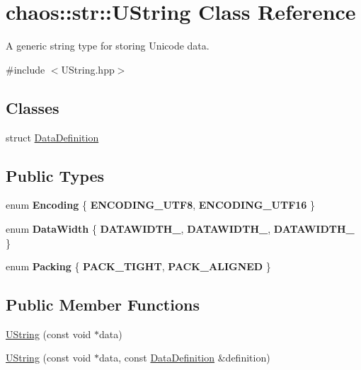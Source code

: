 \hypertarget{classchaos_1_1str_1_1_u_string}{\section{chaos\-:\-:str\-:\-:U\-String Class Reference}
\label{classchaos_1_1str_1_1_u_string}
}


A generic string type for storing Unicode data.  




{\ttfamily \#include $<$U\-String.\-hpp$>$}

\subsection*{Classes}
\begin{DoxyCompactItemize}
\item 
struct \hyperlink{structchaos_1_1str_1_1_u_string_1_1_data_definition}{Data\-Definition}
\end{DoxyCompactItemize}
\subsection*{Public Types}
\begin{DoxyCompactItemize}
\item 
enum {\bfseries Encoding} \{ {\bfseries E\-N\-C\-O\-D\-I\-N\-G\-\_\-\-U\-T\-F8}, 
{\bfseries E\-N\-C\-O\-D\-I\-N\-G\-\_\-\-U\-T\-F16}
 \}
\item 
enum {\bfseries Data\-Width} \{ {\bfseries D\-A\-T\-A\-W\-I\-D\-T\-H\-\_}, 
{\bfseries D\-A\-T\-A\-W\-I\-D\-T\-H\-\_}, 
{\bfseries D\-A\-T\-A\-W\-I\-D\-T\-H\-\_}
 \}
\item 
enum {\bfseries Packing} \{ {\bfseries P\-A\-C\-K\-\_\-\-T\-I\-G\-H\-T}, 
{\bfseries P\-A\-C\-K\-\_\-\-A\-L\-I\-G\-N\-E\-D}
 \}
\end{DoxyCompactItemize}
\subsection*{Public Member Functions}
\begin{DoxyCompactItemize}
\item 
\hyperlink{classchaos_1_1str_1_1_u_string_a1da05f1add70f58c4a8e4b5258db2e01}{U\-String} (const void $\ast$data)
\item 
\hyperlink{classchaos_1_1str_1_1_u_string_ace81f026f57f1db18fa893d1ae474b6b}{U\-String} (const void $\ast$data, const \hyperlink{structchaos_1_1str_1_1_u_string_1_1_data_definition}{Data\-Definition} \&definition)
\end{DoxyCompactItemize}
